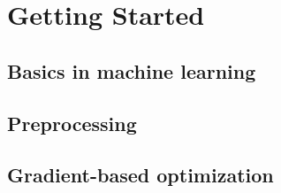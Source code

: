 \section{Getting Started}

\subsection{Basics in machine learning}

\subsection{Preprocessing}

\subsection{Gradient-based optimization}